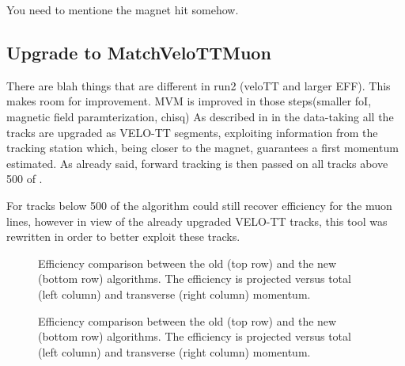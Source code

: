 You need to mentione the magnet hit somehow.
\subsection{Upgrade to MatchVeloTTMuon }
\label{sec:matchvelottmuon}
There are blah things that are different in run2 (veloTT and larger EFF). This makes room for improvement.
MVM is improved in those steps(smaller foI, magnetic field paramterization, chisq)
As described in \cite{LHCb-PUB-2015-005} in the \runtwo data-taking all the tracks are upgraded as VELO-TT segments,
exploiting information from the \ttracker tracking station which, being closer to the magnet,
guarantees a first momentum estimated. As already said, forward tracking is then passed on
all tracks above 500 \mevc of \pt.

For tracks below 500 \mevc of \pt the \mvm algorithm could still recover efficiency for the muon lines,
however in view of the already upgraded VELO-TT tracks, this tool was rewritten in order to better exploit these tracks.


\begin{figure}[h]
  \centering
  \begin{subfigure}{0.5\textwidth}
    \scalebox{.6}{}
    \caption{}
    \label{mvTTm_eff_p}
  \end{subfigure}%
  \hfill%
  \begin{subfigure}{0.5\textwidth}
    \scalebox{.6}{}
    \caption{}
    \label{mvm_eff_p}
  \end{subfigure}
  \caption{Efficiency comparison between the old \mvm (top row) and the new \mvTTm (bottom row) algorithms.
 The efficiency is projected versus total (left column) and transverse (right column) momentum.  }
 \label{mvm_eff_p_comp}
\end{figure}

\begin{figure}[h]
  \centering
  \begin{subfigure}{0.5\textwidth}
    \scalebox{.6}{}
    \caption{}
    \label{mvTTm_eff_p}
  \end{subfigure}%
  \hfill%
  \begin{subfigure}{0.5\textwidth}
    \scalebox{.6}{}
    \caption{}
    \label{mvm_eff_p}
  \end{subfigure}
  \caption{Efficiency comparison between the old \mvm (top row) and the new \mvTTm (bottom row) algorithms.
 The efficiency is projected versus total (left column) and transverse (right column) momentum.  }
 \label{mvm_eff_p_comp}
\end{figure}

